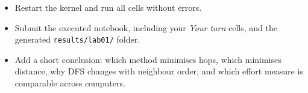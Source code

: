 \begin{labdeliverable}
\begin{itemize}
  \item Restart the kernel and run all cells without errors.
  \item Submit the executed notebook, including your \emph{Your turn} cells, and the generated \texttt{results/lab01/} folder.
  \item Add a short conclusion: which method minimises hops, which minimises distance, why DFS changes with neighbour order, and which effort measure is comparable across computers.
\end{itemize}
\end{labdeliverable}
